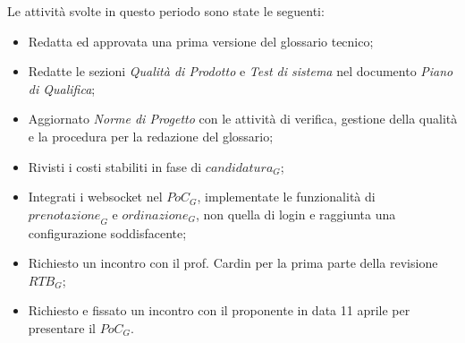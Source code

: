 Le attività svolte in questo periodo sono state le seguenti:
\begin{itemize}
    \item Redatta ed approvata una prima versione del glossario tecnico;
    \item Redatte le sezioni \emph{Qualità di Prodotto} e \emph{Test di sistema} nel documento \emph{Piano di Qualifica};
    \item Aggiornato \emph{Norme di Progetto} con le attività di verifica, gestione della qualità e la procedura per la redazione del glossario;
    \item Rivisti i costi stabiliti in fase di $\textit{candidatura}_G$;
    \item Integrati i websocket nel $\textit{PoC}_G$, implementate le funzionalità di $\textit{prenotazione}_G$ e $\textit{ordinazione}_G$, non quella di login e raggiunta una configurazione soddisfacente;
    \item Richiesto un incontro con il prof. Cardin per la prima parte della revisione $\textit{RTB}_G$;
    \item Richiesto e fissato un incontro con il proponente in data 11 aprile per presentare il $\textit{PoC}_G$.
\end{itemize}
